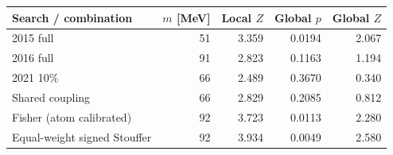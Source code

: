 \begin{center}\small\begin{tabular}{lrrrr}\toprule
Search / combination & $m$ [MeV] & Local $Z$ & Global $p$ & Global $Z$\\\midrule
2015 full & 51 & 3.359 & 0.0194 & 2.067\\
2016 full & 91 & 2.823 & 0.1163 & 1.194\\
2021 10\% & 66 & 2.489 & 0.3670 & 0.340\\
Shared coupling & 66 & 2.829 & 0.2085 & 0.812\\
Fisher (atom calibrated) & 92 & 3.723 & 0.0113 & 2.280\\
Equal-weight signed Stouffer & 92 & 3.934 & 0.0049 & 2.580\\
\bottomrule\end{tabular}\end{center}
